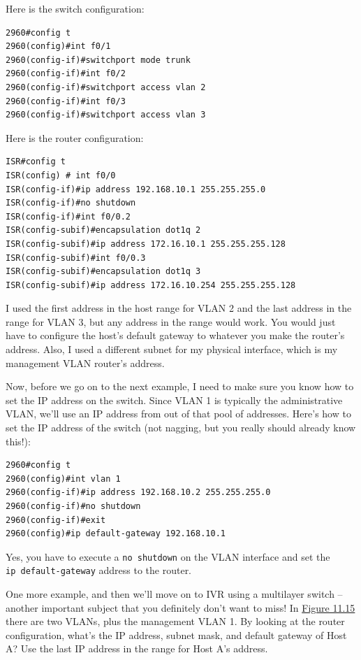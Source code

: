 Here is the switch configuration:

\begin{verbatim}
2960#config t
2960(config)#int f0/1
2960(config-if)#switchport mode trunk
2960(config-if)#int f0/2
2960(config-if)#switchport access vlan 2
2960(config-if)#int f0/3
2960(config-if)#switchport access vlan 3
\end{verbatim}

Here is the router configuration:

\begin{verbatim}
ISR#config t
ISR(config) # int f0/0
ISR(config-if)#ip address 192.168.10.1 255.255.255.0
ISR(config-if)#no shutdown
ISR(config-if)#int f0/0.2
ISR(config-subif)#encapsulation dot1q 2
ISR(config-subif)#ip address 172.16.10.1 255.255.255.128
ISR(config-subif)#int f0/0.3
ISR(config-subif)#encapsulation dot1q 3
ISR(config-subif)#ip address 172.16.10.254 255.255.255.128
\end{verbatim}

I used the first address in the host range for VLAN 2 and the last
address in the range for VLAN 3, but any address in the range would
work. You would just have to configure the host's default gateway to
whatever you make the router's address. Also, I used a different subnet
for my physical interface, which is my management VLAN router's address.

Now, before we go on to the next example, I need to make sure you know
how to set the IP address on the switch. Since VLAN 1 is typically the
administrative VLAN, we'll use an IP address from out of that pool of
addresses. Here's how to set the IP address of the switch (not nagging,
but you really should already know this!):

\begin{verbatim}
2960#config t
2960(config)#int vlan 1
2960(config-if)#ip address 192.168.10.2 255.255.255.0
2960(config-if)#no shutdown
2960(config-if)#exit
2960(config)#ip default-gateway 192.168.10.1
\end{verbatim}

Yes, you have to execute a \texttt{no\ shutdown} on the VLAN interface
and set the \texttt{ip\ default-gateway} address to the router.

One more example, and then we'll move on to IVR using a multilayer
switch -- another important subject that you definitely don't want to
miss! In \protect\hyperlink{c11.xhtmlux5cux23figure11-15}{Figure 11.15}
there are two VLANs, plus the management VLAN 1. By looking at the
router configuration, what's the IP address, subnet mask, and default
gateway of Host A? Use the last IP address in the range for Host A's
address.

